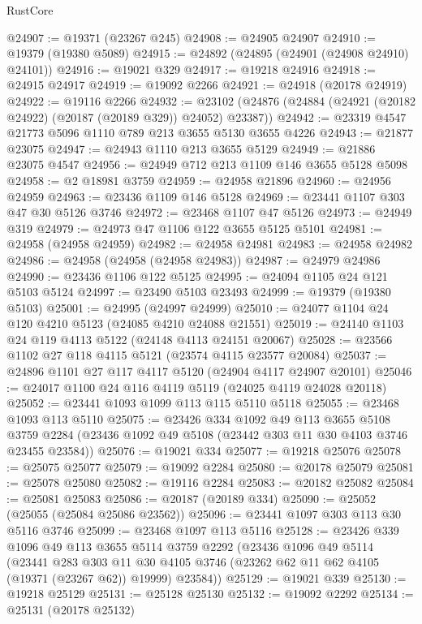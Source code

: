 \begin{lexlean}{RustCore}
\begin{coremodule}
@24907 := @19371 (@23267 @245)
@24908 := @24905 @24907
@24910 := @19379 (@19380 @5089)
@24915 := @24892 (@24895 (@24901 (@24908 @24910) @24101))
@24916 := @19021 @329
@24917 := @19218 @24916
@24918 := @24915 @24917
@24919 := @19092 @2266
@24921 := @24918 (@20178 @24919)
@24922 := @19116 @2266
@24932 := @23102 (@24876 (@24884 (@24921 (@20182 @24922) (@20187 (@20189 @329)) @24052) @23387))
@24942 := @23319 @4547 @21773 @5096 @1110 @789 @213 @3655 @5130 @3655 @4226
@24943 := @21877 @23075
@24947 := @24943 @1110 @213 @3655 @5129
@24949 := @21886 @23075 @4547
@24956 := @24949 @712 @213 @1109 @146 @3655 @5128 @5098
@24958 := @2 @18981 @3759
@24959 := @24958 @21896
@24960 := @24956 @24959
@24963 := @23436 @1109 @146 @5128
@24969 := @23441 @1107 @303 @47 @30 @5126 @3746
@24972 := @23468 @1107 @47 @5126
@24973 := @24949 @319
@24979 := @24973 @47 @1106 @122 @3655 @5125 @5101
@24981 := @24958 (@24958 @24959)
@24982 := @24958 @24981
@24983 := @24958 @24982
@24986 := @24958 (@24958 (@24958 @24983))
@24987 := @24979 @24986
@24990 := @23436 @1106 @122 @5125
@24995 := @24094 @1105 @24 @121 @5103 @5124
@24997 := @23490 @5103 @23493
@24999 := @19379 (@19380 @5103)
@25001 := @24995 (@24997 @24999)
@25010 := @24077 @1104 @24 @120 @4210 @5123 (@24085 @4210 @24088 @21551)
@25019 := @24140 @1103 @24 @119 @4113 @5122 (@24148 @4113 @24151 @20067)
@25028 := @23566 @1102 @27 @118 @4115 @5121 (@23574 @4115 @23577 @20084)
@25037 := @24896 @1101 @27 @117 @4117 @5120 (@24904 @4117 @24907 @20101)
@25046 := @24017 @1100 @24 @116 @4119 @5119 (@24025 @4119 @24028 @20118)
@25052 := @23441 @1093 @1099 @113 @115 @5110 @5118
@25055 := @23468 @1093 @113 @5110
@25075 := @23426
    @334
    @1092
    @49
    @113
    @3655
    @5108
    @3759
    @2284
    (@23436 @1092 @49 @5108 (@23442 @303 @11 @30 @4103 @3746 @23455 @23584))
@25076 := @19021 @334
@25077 := @19218 @25076
@25078 := @25075 @25077
@25079 := @19092 @2284
@25080 := @20178 @25079
@25081 := @25078 @25080
@25082 := @19116 @2284
@25083 := @20182 @25082
@25084 := @25081 @25083
@25086 := @20187 (@20189 @334)
@25090 := @25052 (@25055 (@25084 @25086 @23562))
@25096 := @23441 @1097 @303 @113 @30 @5116 @3746
@25099 := @23468 @1097 @113 @5116
@25128 := @23426
    @339
    @1096
    @49
    @113
    @3655
    @5114
    @3759
    @2292
    (@23436
      @1096
      @49
      @5114
      (@23441
        @283
        @303
        @11
        @30
        @4105
        @3746
        (@23262 @62 @11 @62 @4105 (@19371 (@23267 @62)) @19999)
        @23584))
@25129 := @19021 @339
@25130 := @19218 @25129
@25131 := @25128 @25130
@25132 := @19092 @2292
@25134 := @25131 (@20178 @25132)

\end{coremodule}
\end{lexlean}
